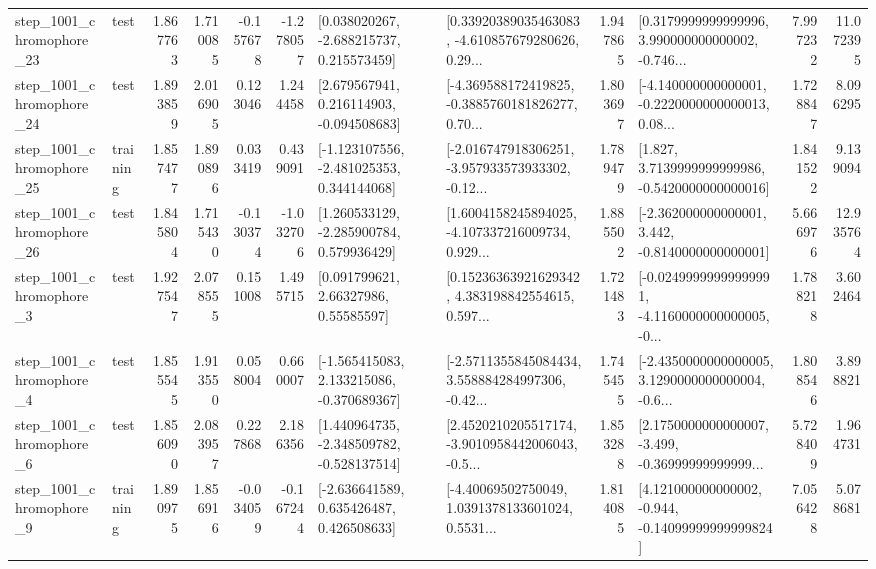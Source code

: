 \begin{tabular}{llrrrrllrlrr}
 step\_1001\_chromophore\_23 &      test &      1.867763 &    1.710085 &     -0.157678 & -1.278057 &    [0.038020267, -2.688215737, 0.215573459] &  [0.33920389035463083, -4.610857679280626, 0.29... &       1.947865 &  [0.3179999999999996, 3.990000000000002, -0.746... &            7.997232 &         11.072395 \\
 step\_1001\_chromophore\_24 &      test &      1.893859 &    2.016905 &      0.123046 &  1.244458 &    [2.679567941, 0.216114903, -0.094508683] &  [-4.369588172419825, -0.3885760181826277, 0.70... &       1.803697 &  [-4.140000000000001, -0.2220000000000013, 0.08... &            1.728847 &          8.096295 \\
 step\_1001\_chromophore\_25 &  training &      1.857477 &    1.890896 &      0.033419 &  0.439091 &   [-1.123107556, -2.481025353, 0.344144068] &  [-2.016747918306251, -3.957933573933302, -0.12... &       1.789479 &   [1.827, 3.7139999999999986, -0.5420000000000016] &            1.841522 &          9.139094 \\
 step\_1001\_chromophore\_26 &      test &      1.845804 &    1.715430 &     -0.130374 & -1.032706 &    [1.260533129, -2.285900784, 0.579936429] &  [1.6004158245894025, -4.107337216009734, 0.929... &       1.885502 &   [-2.362000000000001, 3.442, -0.8140000000000001] &            5.666976 &         12.935764 \\
  step\_1001\_chromophore\_3 &      test &      1.927547 &    2.078555 &      0.151008 &  1.495715 &       [0.091799621, 2.66327986, 0.55585597] &  [0.15236363921629342, 4.383198842554615, 0.597... &       1.721483 &  [-0.02499999999999991, -4.1160000000000005, -0... &            1.788218 &          3.602464 \\
  step\_1001\_chromophore\_4 &      test &      1.855545 &    1.913550 &      0.058004 &  0.660007 &   [-1.565415083, 2.133215086, -0.370689367] &  [-2.5711355845084434, 3.558884284997306, -0.42... &       1.745455 &  [-2.4350000000000005, 3.1290000000000004, -0.6... &            1.808546 &          3.898821 \\
  step\_1001\_chromophore\_6 &      test &      1.856090 &    2.083957 &      0.227868 &  2.186356 &   [1.440964735, -2.348509782, -0.528137514] &  [2.4520210205517174, -3.9010958442006043, -0.5... &       1.853288 &  [2.1750000000000007, -3.499, -0.36999999999999... &            5.728409 &          1.964731 \\
  step\_1001\_chromophore\_9 &  training &      1.890975 &    1.856916 &     -0.034059 & -0.167244 &    [-2.636641589, 0.635426487, 0.426508633] &  [-4.40069502750049, 1.0391378133601024, 0.5531... &       1.814085 &  [4.121000000000002, -0.944, -0.14099999999999824] &            7.056428 &          5.078681 \\

\end{tabular}
